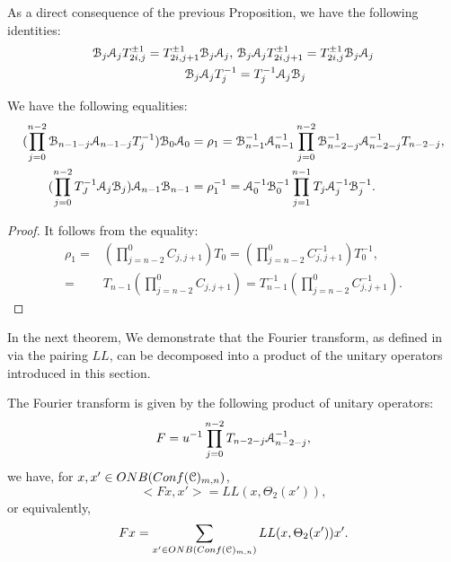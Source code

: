\documentclass{amsart}
\begin{document}
As a direct consequence of the previous Proposition, we have the following identities:
\begin{align}
\BB_j\AA_jT^{\pm1}_{2i,j}=T^{\pm1}_{2i,j+1}\BB_j\AA_j,\ &\BB_j\AA_jT^{\pm1}_{2i,j+1}=T^{\pm1}_{2i,j}\BB_j\AA_j\label{eq:BAT_rels_1}\\ 
\BB_j\AA_jT^{-1}_{j}&=T^{-1}_j\AA_j\BB_j\label{eq:BAT_rels_2}
\end{align}
\begin{Cor}\label{Cor:ABTrho_1_rels}
We have the following equalities:
\begin{align}
(\prod^{n-2}_{j=0}\BB_{n-1-j}\AA_{n-1-j}T^{-1}_{j})\BB_{0}\AA_{0}&=\rho_1=\BB^{-1}_{n-1}\AA^{-1}_{n-1}\prod_{j=0}^{n-2}\BB^{-1}_{n-2-j}\AA^{-1}_{n-2-j}T_{n-2-j}, \\   
(\prod^{n-2}_{j=0}T^{-1}_J\AA_{j}\BB_{j})\AA_{n-1}\BB_{n-1}&=\rho^{-1}_1=\AA^{-1}_{0}\BB^{-1}_{0}\prod^{n-1}_{j=1}T_{j}\AA^{-1}_{j}\BB^{-1}_{j}.
\end{align}
\end{Cor}
\begin{proof}
 It follows from the equality:
 \[
 \begin{aligned}
  \rho_1=&(\prod^{0}_{j=n-2}C_{j,j+1})T_0=(\prod^{0}_{j=n-2}C^{-1}_{j,j+1})T^{-1}_0,\\
  =&T_{n-1}(\prod^{0}_{j=n-2}C_{j,j+1})=T^{-1}_{n-1}(\prod^{0}_{j=n-2}C^{-1}_{j,j+1}).
 \end{aligned}
 \]
\end{proof}
 In the next theorem, We demonstrate that the Fourier transform, as defined in \cite{LX19} via the pairing $LL$, can be decomposed into a product of the unitary operators introduced in this section.

\begin{Thm}\label{thm:Fourier_transform}
The Fourier transform is given by the following product of unitary operators:
\[
F=u^{-1}\prod^{n-2}_{j=0} T_{n-2-j}\AA^{-1}_{n-2-j},
\]
we have, for $x,x'\in ONB(Conf(\CC)_{m,n})$,
\[
<Fx, x'>=LL(x,\Theta_2(x')),
\]
or equivalently,
\[
Fx=\sum_{x'\in ONB(Conf(\CC)_{m,n})}LL(x,\Theta_2(x'))x'.
\]
\end{Thm}
\end{document}
